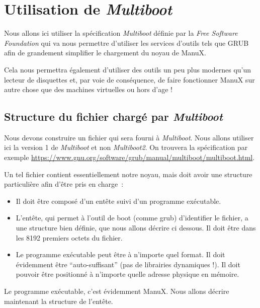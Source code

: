 \section{Utilisation de {\em Multiboot}}

   Nous allons ici utiliser la spécification {\em Multiboot} définie
par la {\em Free Software Foundation} qui va nous permettre d'utiliser
les services d'outils tels que GRUB afin de grandement simplifier
le chargement du noyau de ManuX.

   Cela nous permettra également d'utiliser des outils un peu plus
modernes qu'un lecteur de disquettes et, par voie de conséquence, de
faire fonctionner ManuX sur autre chose que des machines virtuelles ou
hors d'age !

%
\subsection{Structure du fichier chargé par {\em Multiboot}}

   Nous devons construire un fichier qui sera fourni à {\em
Multiboot}.  Nous allons utiliser ici la version 1 de {\em Multiboot} et
non {\em Multiboot2}. On trouvera la spécification par exemple
\href{ici}{https://www.gnu.org/software/grub/manual/multiboot/multiboot.html}.

   Un tel fichier contient essentiellement notre noyau, mais doit avoir
une structure particulière afin d'être pris en charge~:

\begin{itemize}
   \item Il doit être composé d'un entête suivi d'un programme
     exécutable.
   \item L'entête, qui permet à l'outil de boot (comme {\sc grub})
     d'identifier le fichier, a une structure bien définie, que nous
     allons décrire ci dessous. Il doit être dans les 8192 premiers
     octets du fichier.
   \item Le programme exécutable peut être à n'importe quel format. Il
     doit évidemment être ``auto-suffisant'' (pas de librairies
     dynamiques !). Il doit pouvoir être positionné à n'importe quelle
     adresse physique en mémoire. 
\end{itemize}

   Le programme exécutable, c'est évidemment ManuX. Nous allons
décrire maintenant la structure de l'entête.
     
